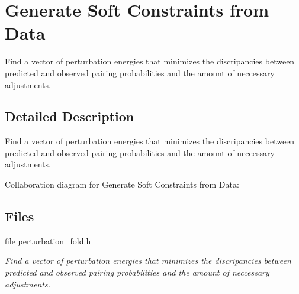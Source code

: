 \hypertarget{group__perturbation}{}\section{Generate Soft Constraints from Data}
\label{group__perturbation}


Find a vector of perturbation energies that minimizes the discripancies between predicted and observed pairing probabilities and the amount of neccessary adjustments.  




\subsection{Detailed Description}
Find a vector of perturbation energies that minimizes the discripancies between predicted and observed pairing probabilities and the amount of neccessary adjustments. 

Collaboration diagram for Generate Soft Constraints from Data\+:
\subsection*{Files}
\begin{DoxyCompactItemize}
\item 
file \mbox{\hyperlink{perturbation__fold_8h}{perturbation\+\_\+fold.\+h}}
\begin{DoxyCompactList}\small\item\em Find a vector of perturbation energies that minimizes the discripancies between predicted and observed pairing probabilities and the amount of neccessary adjustments. \end{DoxyCompactList}\end{DoxyCompactItemize}
